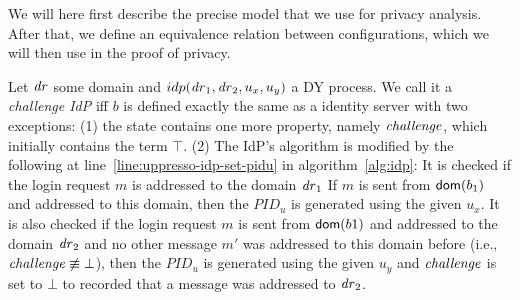   We will here first describe the precise model that we use for 
  privacy analysis. After that, we define an equivalence 
  relation between configurations, which we will then use in the 
  proof of privacy.
  
  \begin{definition}
    Let $\mathit{dr}$ some domain and 
    $idp(\mathit{dr}_1, \mathit{dr}_2, u_x, u_y)$ a DY process. 
    We call it a \emph{challenge IdP} iff $b$
    is defined exactly the same as a identity server with two 
    exceptions: (1) the state contains one more property, 
    namely $\mathit{challenge}$, which initially contains the term 
    $\top$. 
    (2) The IdP's algorithm is modified by the following at 
    line~\ref{line:uppresso-idp-set-pidu} in 
    algorithm~\ref{alg:idp}: It is checked if the login 
    request $m$ is addressed to the domain $\mathit{dr}_1$ 
    If $m$ is sent from $\mathsf{dom}(b_1)$ and addressed to this 
    domain, then the $PID_u$ is generated using the given $u_x$.
    It is also checked if the login request $m$ is sent from 
    $\mathsf{dom}(b1)$ and addressed to the domain $\mathit{dr}_2$ 
    and no other message $m'$ was 
    addressed to this domain before (i.e., $\mathit{challenge} 
    \not\equiv \bot$), then the $PID_u$ is generated using 
    the given $u_y$ and $\mathit{challenge}$ is set to $\bot$ to 
    recorded that a message was addressed to $\mathit{dr}_2$. 
  \end{definition}
  
